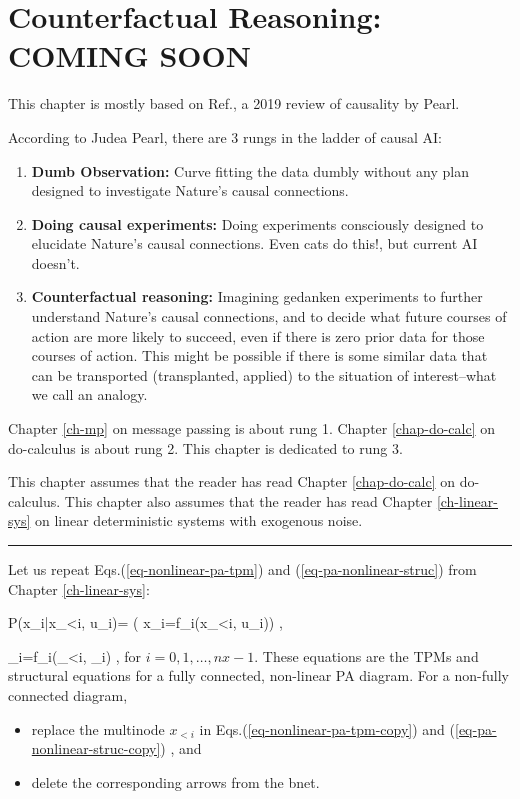 \chapter{Counterfactual Reasoning: COMING SOON}\label{ch-counterf}
This chapter is mostly based on 
Ref.\cite{pearl-2019review}, a 2019
 review of causality by Pearl.


According to 
Judea Pearl,
there are 3 rungs in the
ladder of causal AI:
\begin{enumerate}
\item
{\bf Dumb Observation:} Curve fitting the
data
dumbly
without any plan 
designed to
investigate Nature's 
causal connections.
\item {\bf Doing causal
experiments:} 
Doing experiments 
consciously designed to
elucidate
Nature's causal connections.
Even cats do this!, but current AI doesn't.
\item {\bf Counterfactual reasoning:}
Imagining gedanken experiments
to further understand
Nature's causal connections,
and to decide what future
courses of action are
more likely to succeed,
even if there is zero
prior data for 
those courses of action.
This might be possible if there
is some similar
data that can be transported
(transplanted, applied)
to the situation of
interest--what we call
an analogy.
\end{enumerate}
Chapter \ref{ch-mp}
on message passing
is about rung 1.
Chapter \ref{chap-do-calc}
on do-calculus is about rung 2.
This chapter is dedicated to rung 3.

This chapter
assumes that the reader
has read
Chapter \ref{chap-do-calc}
on do-calculus.
This chapter also 
assumes that the reader has read 
Chapter \ref{ch-linear-sys}  
on linear 
deterministic systems
with exogenous noise.

\hrule
Let
us repeat
Eqs.(\ref{eq-nonlinear-pa-tpm})
and
(\ref{eq-pa-nonlinear-struc})
from Chapter \ref{ch-linear-sys}:


\beq\color{blue}
P(x_i|x_{<i}, u_i)=
\indi(
x_i=f_i(x_{<i}, u_i))
\;,
\label{eq-nonlinear-pa-tpm-copy}
\eeq

\beq
\rvx_i=f_i(\rvx_{<i}, \rvu_i)
\;,
\label{eq-pa-nonlinear-struc-copy}
\eeq
for $i=0, 1, \ldots, nx-1$.
These equations
are the TPMs and
structural equations
for a 
fully connected, non-linear PA diagram.
For a non-fully connected 
diagram, 
\begin{itemize}
\item
replace the multinode $x_{<i}$
in 
Eqs.(\ref{eq-nonlinear-pa-tpm-copy})
and (\ref{eq-pa-nonlinear-struc-copy})
,
and
\item
delete
the corresponding arrows
from the bnet.
\end{itemize}


